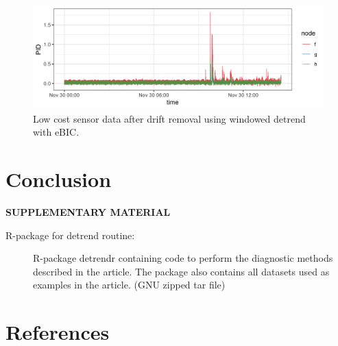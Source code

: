 \documentclass[12pt]{article}
\begin{document}
	\begin{figure}
		\caption{Low cost sensor data after drift removal using windowed detrend with eBIC.}
		\includegraphics[width = \linewidth]{Figures/corrected_data.png}
	\end{figure}

		
	

	\section{Conclusion}
	\label{sec:conc}
	
	
	\bigskip
	\begin{center}
		{\large\bf SUPPLEMENTARY MATERIAL}
	\end{center}
	
	\begin{description}
		
		\item[R-package for detrend routine:] R-package detrendr containing code to perform the diagnostic methods described in the article. The package also contains all datasets used as examples in the article. (GNU zipped tar file)
				
	\end{description}
	
	\section{References}

	
	
	
	
\end{document}
